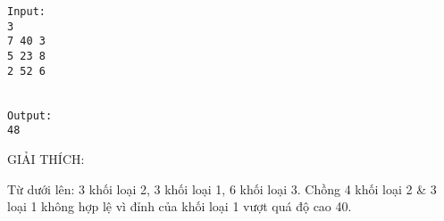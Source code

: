 \begin{verbatim}
Input:
3
7 40 3
5 23 8
2 52 6


Output:
48
\end{verbatim}

GIẢI THÍCH:

Từ dưới lên: 3 khối loại 2, 3 khối loại 1, 6 khối loại 3. Chồng 4 khối loại 2 \& 3 loại 1 không hợp lệ vì đỉnh của khối loại 1 vượt quá độ cao 40.